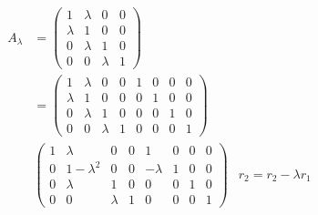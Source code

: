 \documentclass{article}
\begin{document}
\begin{align*}
    A_\lambda &= \begin{pmatrix}
    1 & \lambda & 0 & 0 \\
    \lambda & 1 & 0 & 0 \\
    0 & \lambda & 1 & 0 \\
    0 & 0 & \lambda & 1
\end{pmatrix} \\
&= \left(
    \begin{array}{cccc|cccc}
        1 & \lambda & 0 & 0 & 1 & 0 & 0 & 0 \\
        \lambda & 1 & 0 & 0 & 0 & 1 & 0 & 0 \\
        0 & \lambda & 1 & 0 & 0 & 0 & 1 & 0 \\
        0 & 0 & \lambda & 1 & 0 & 0 & 0 & 1
    \end{array}
\right) \\
&\left(
    \begin{array}{cccc|cccc}
        1 & \lambda & 0 & 0 & 1 & 0 & 0 & 0 \\
        0 & 1 - \lambda^2 & 0 & 0 & -\lambda & 1 & 0 & 0 \\
        0 & \lambda & 1 & 0 & 0 & 0 & 1 & 0 \\
        0 & 0 & \lambda & 1 & 0 & 0 & 0 & 1
    \end{array}
\right) & r_2 = r_2 - \lambda r_1 \\
\end{align*}
\end{document}
